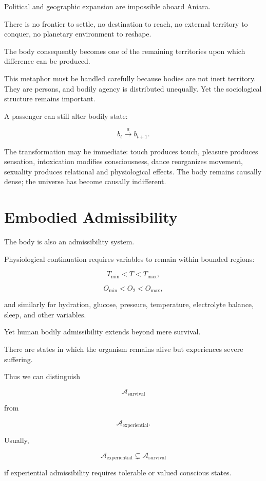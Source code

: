 \documentclass[11pt,oneside]{book}
\theoremstyle{definition}
\theoremstyle{remark}
\newcommand{\A}{\mathcal{A}}
\begin{document}
Political and geographic expansion are impossible aboard Aniara.

There is no frontier to settle, no destination to reach, no external territory to conquer, no planetary environment to reshape.

The body consequently becomes one of the remaining territories upon which difference can be produced.

This metaphor must be handled carefully because bodies are not inert territory. They are persons, and bodily agency is distributed unequally. Yet the sociological structure remains important.

A passenger can still alter bodily state:

\[
b_t
\xrightarrow{a}
b_{t+1}.
\]

The transformation may be immediate: touch produces touch, pleasure produces sensation, intoxication modifies consciousness, dance reorganizes movement, sexuality produces relational and physiological effects. The body remains causally dense; the universe has become causally indifferent.

\section{Embodied Admissibility}

The body is also an admissibility system.

Physiological continuation requires variables to remain within bounded regions:

\[
T_{\min}
<
T
<
T_{\max},
\]

\[
O_{\min}
<
O_2
<
O_{\max},
\]

and similarly for hydration, glucose, pressure, temperature, electrolyte balance, sleep, and other variables.

Yet human bodily admissibility extends beyond mere survival.

There are states in which the organism remains alive but experiences severe suffering.

Thus we can distinguish

\[
\A_{\mathrm{survival}}
\]

from

\[
\A_{\mathrm{experiential}}.
\]

Usually,

\[
\A_{\mathrm{experiential}}
\subsetneq
\A_{\mathrm{survival}}
\]

if experiential admissibility requires tolerable or valued conscious states.
\end{document}
